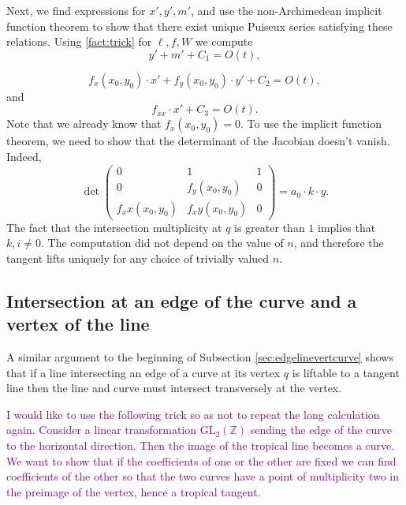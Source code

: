 \documentclass[oneside]{amsart}
\newcommand{\ZZ}{\mathbb{Z}}
\theoremstyle{definition}
\newcommand{\kristin}[1]{\textcolor{purple}{#1}}
\begin{document}
Next, we find expressions for $x',y',m'$, and use the non-Archimedean implicit function theorem to show that there exist unique Puiseux series satisfying these relations. Using \ref{fact:trick} for  $\ell, f, W$ we compute 
\[
y'+m' + C_1 = O(t),
\]

\[
f_x(x_0,y_0)\cdot x' + f_y(x_0,y_0)\cdot y' + C_2 = O(t),
\]
and 
\[
f_{xx}\cdot x' + C_3 = O(t).
\]
Note that we already know that $f_x(x_0,y_0) = 0$.
To use the  implicit function theorem, we need to show that the determinant of the Jacobian doesn't vanish. Indeed, 
\[
\det\begin{pmatrix}
  0 & 1 & 1 \\
  0 & f_y(x_0,y_0) & 0 \\
  f_xx(x_0,y_0) & f_xy(x_0,y_0) & 0
 \end{pmatrix} = a_0\cdot k\cdot y.
 \]
The fact that the intersection multiplicity at $q$ is greater than $1$ implies that $k,i\neq 0$. The computation did not depend on the value of $n$, and therefore the tangent lifts uniquely for any choice of trivially valued $n$.

\subsection{Intersection at an edge of the curve and a vertex of the line} 

A similar argument to the beginning of Subsection \ref{sec:edgelinevertcurve} shows that if  a line intersecting an edge of a curve at its vertex $q$ is liftable to a tangent line then the line and curve must intersect transversely at the vertex. 

\kristin{I would like to use the following trick so as not to repeat the long calculation again. Consider a linear transformation $\text{GL}_2(\ZZ)$ sending the edge of the curve to the horizontal direction. Then the image of the tropical line becomes a curve. We want to show that if the coefficients of one or the other are fixed we can find coefficients of the other so that the two curves have a point of multiplicity two in the preimage of the vertex, hence a tropical tangent. } 
\end{document}
